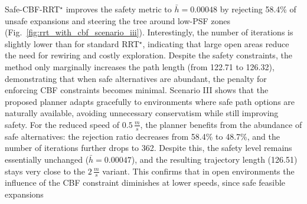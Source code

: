 \documentclass{svproc}
\begin{document}
Safe-CBF-RRT$^\star$ improves the safety metric to $\bar h=0.00048$ by rejecting
58.4\% of unsafe expansions and steering the tree around low-PSF zones
(Fig.~\ref{fig:rrt_with_cbf_scenario_iii}). Interestingly, the number of
iterations is slightly lower than for standard RRT$^\star$, indicating that
large open areas reduce the need for rewiring and costly exploration. Despite
the safety constraints, the method only marginally increases the path length
(from 122.71 to 126.32), demonstrating that when safe alternatives are abundant,
the penalty for enforcing CBF constraints becomes minimal.
Scenario III shows that the proposed planner adapts gracefully to environments
where safe path options are naturally available, avoiding unnecessary
conservatism while still improving safety.
For the reduced speed of $0.5\,\frac{m}{s}$, the planner benefits from the
abundance of safe alternatives: the rejection ratio decreases from 58.4\% to
48.7\%, and the number of iterations further drops to 362. Despite this, the
safety level remains essentially unchanged ($\bar h=0.00047$), and the resulting
trajectory length (126.51) stays very close to the
$2\,\frac{m}{s}$ variant. This confirms that in open environments the influence
of the CBF constraint diminishes at lower speeds, since safe feasible expansions
\end{document}
